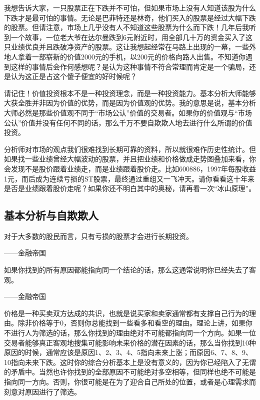 我想告诉大家，一只股票正在下跌并不可怕，但如果市场上没有人知道该股为什么下跌才是最可怕的事情。无论是巴菲特还是林奇，他们买入的股票是经过大幅下跌的股票。但请注意，市场上几乎没有人不知道这些股票为什么而下跌！几年后我听到一个故事，一位老大爷在达尔曼跌到6元附近时，用全部几十万的资金买入了这只业绩优良并且跌破净资产的股票。这让我想起经常在马路上出现的一幕，一些外地人拿着一部崭新的价值2000元的手机，以200元的价格向路人出售。不知道你遇到这样的事情后会作何感想呢？是认为这种事情不符合常理而肯定是一个骗局，还是认为这正是占这个傻子便宜的好时候呢？

请记住！价值投资根本不是一种投资理念，而是一种投资能力。基本分析大师能够大获全胜并非因为价值的优势，而是因为价值观的优势。我的意思是说，基本分析大师必然是那些价值观不同于“市场公认”价值的交易者。如果你的价值观与“市场公认”价值并没有任何不同的话，那么千万不要自欺欺人地去进行什么所谓的价值投资。

分析师对市场的观点我们很难找到长期可靠的资料，所以就很难作历史性统计。但如果找一些业绩曾经大幅波动的股票，并且把业绩和价格做成走势图叠加来看，你会发现不是股价跟着业绩走，而是业绩跟着股价走。比如600886，1997年每股收益1元，而后成为连续亏损的ST股票，最终通过重组又一飞冲天。请你看看这十年来是否是业绩跟着股价走呢？如果你还不明白其中的奥秘，请再看一次“冰山原理”。

\subsection{基本分析与自欺欺人}

{\kaishu
对于大多数的股民而言，只有亏损的股票才会进行长期投资。

\hfill ——金融帝国

如果你找到的所有原因都能指向同一个结论的话，那么这通常说明你已经失去了客观。

\hfill ——金融帝国
}

价格是一种买卖双方达成的共识，也就是说买家和卖家通常都有支撑自己行为的理由。除非价格等于0，否则你总能找到一些看多和看空的理由。理论上讲，如果你不进行人为筛选的话，那么你找到的理由绝对不可能都指向同一个方向。如果一位交易者能够真正客观地搜集可能影响未来价格的潜在因素的话，那么当你找到10种原因的时候，通常应该是原因1、2、3、4、5指向未来上涨；而原因6、7、8、9、10指向未来下跌。这时你的综合分析基本上是没有意义的，因为你已经陷入了无谓的矛盾中。当然也许你找到的全部原因不可能绝对多空相等，但同样也绝不可能是指向同一方向。否则，你很可能是在为了迎合自己所处的位置，或者是心理需求而刻意对原因进行了筛选。

